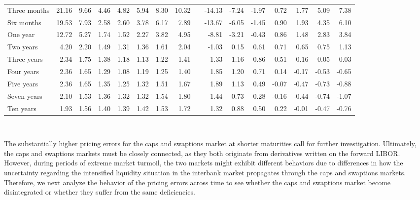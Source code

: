 \documentclass[11pt,a4paper,english,oneside]{book}
\numberwithin{equation}{chapter}
\begin{document}
\begin{table}
\begin{tabular}{lrrrrrrrlrrrrrrr}
		
		\midrule
		Three months	&	21.16  & 9.66  &  4.46 & 4.82  & 5.94&8.30  & 10.32 && -14.13  & -7.24&  -1.97&  0.72 &   1.77&  5.09&   7.38\\
		Six months	&	19.53  & 7.93  &  2.58 & 2.60  & 3.78&6.17  &  7.89 && -13.67  & -6.05&  -1.45&  0.90 &   1.93&  4.35&   6.10\\
		One year	&	12.72  & 5.27  &  1.74 & 1.52  & 2.27&3.82  &  4.95 && -8.81   &-3.21 & -0.43 &  0.86 &  1.48 & 2.83 &  3.84\\
		Two years	&	 4.20  & 2.20  &  1.49 & 1.31  & 1.36&1.61  &  2.04 && -1.03   & 0.15 &  0.61 &  0.71 &  0.65 & 0.75 &  1.13\\
		Three years	&	 2.34  & 1.75  &  1.38 & 1.18  & 1.13&1.22  &  1.41 &&  1.33   & 1.16 &  0.86 &  0.51 &  0.16 &-0.05 & -0.03\\
		Four years	&	 2.36  & 1.65  &  1.29 & 1.08  & 1.19&1.25  &  1.40 &&  1.85   & 1.20 &  0.71 &  0.14 & -0.17 &-0.53 & -0.65\\
		Five years	&	 2.36  & 1.65  &  1.35 & 1.25  & 1.32&1.51  &  1.67 &&  1.89   & 1.13 &  0.49 & -0.07 & -0.47 &-0.73 & -0.88\\
		Seven years	&	 2.10  & 1.53  &  1.36 & 1.32  & 1.32&1.54  &  1.80	&&  1.44   & 0.73 &  0.28 & -0.16 & -0.44 &-0.74 & -1.07\\
		Ten years   &  1.93   & 1.56  &  1.40 & 1.39  & 1.42&1.53  &  1.72 &&  1.32   &0.88  &  0.50 &  0.22 & -0.01 & -0.47& -0.76\\ \bottomrule
	\end{tabular}\\
\end{table}



The substantially higher pricing errors for the caps and swaptions market at shorter maturities call for further investigation.
Ultimately, the caps and swaptions markets must be closely connected, as they both originate from derivatives written on the forward LIBOR. However, during periods of extreme market turmoil, the two markets might exhibit different behaviors due to differences in how the uncertainty regarding the intensified liquidity situation in the interbank market propagates through the caps and swaptions markets. Therefore, we next analyze the behavior of the pricing errors across time to see whether the caps and swaptions market become disintegrated or whether they suffer from the same deficiencies.
\end{document}
